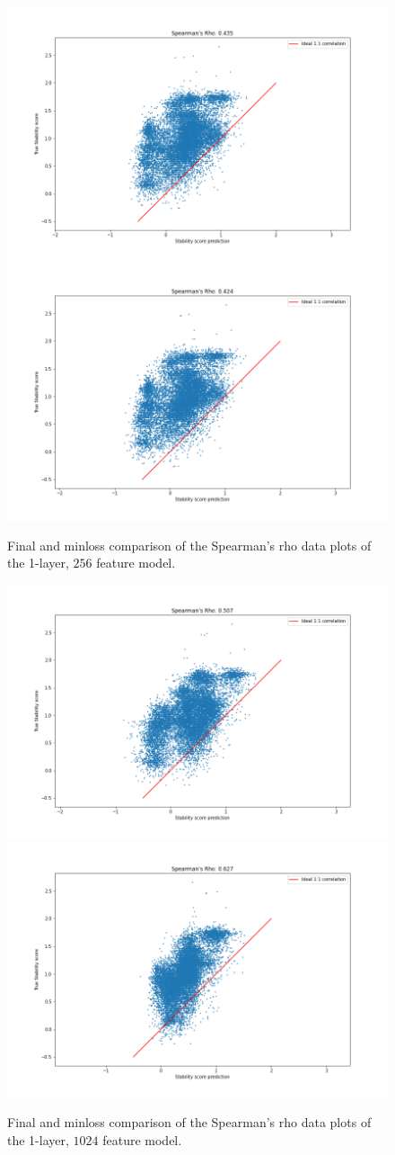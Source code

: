 \begin{figure}[!ht]
  \includegraphics[width=0.49\linewidth]{latex/imgs/spearman_1_layer_with_schedule_256_final.png}
  \includegraphics[width=0.49\linewidth]{latex/imgs/spearman_1_layer_with_schedule_256_minloss.png}
  \caption{Final and minloss comparison of the Spearman's rho data plots of the 1-layer, $256$ feature model.}
\end{figure}
\begin{figure}[!ht]
  \includegraphics[width=0.49\linewidth]{latex/imgs/spearman_1_layer_with_schedule_1024_final.png}
  \includegraphics[width=0.49\linewidth]{latex/imgs/spearman_1_layer_with_schedule_1024_minloss.png}
  \caption{Final and minloss comparison of the Spearman's rho data plots of the 1-layer, $1024$ feature model.}
\end{figure}

